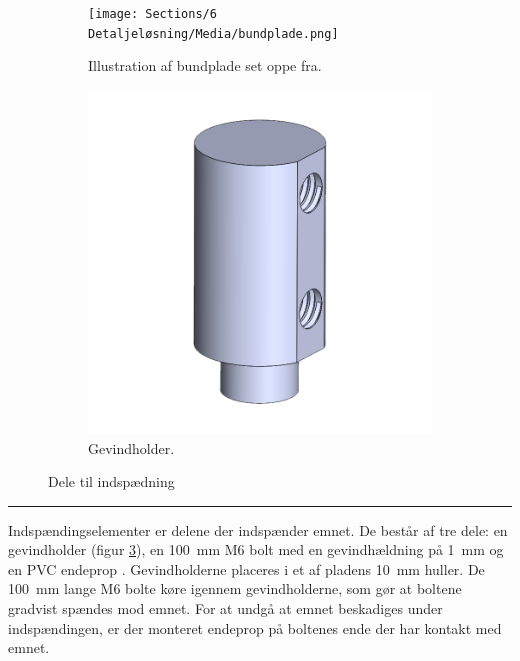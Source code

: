 \begin{figure}[H]
    \centering
    \begin{subfigure}[b]{0.49\textwidth}
         \centering
        \texttt{[image: Sections/6 Detaljeløsning/Media/bundplade.png]}
         \caption{Illustration af bundplade set oppe fra.}
       \label{fig: bundplade}
    \end{subfigure}
    \begin{subfigure}[b]{0.49\textwidth}
      \centering
      \includegraphics[width=.7\linewidth]{Sections/6 Detaljeløsning/Media/Billeder til indspænding/Gevindholder.png}
      \caption{Gevindholder.}
      \label{fig: gevindholder}
    \end{subfigure}
    \caption{Dele til indspædning}
\end{figure} \plainbreak{-.5}

Indspændingselementer er delene der indspænder emnet. De består af tre dele: en gevindholder (figur \ref{fig: gevindholder}), en \SI{100}{mm} M6 bolt med en gevindhældning på \SI{1}{mm} \parencite{RSComponents2025M6RS} og en PVC endeprop \parencite{Profillageret2025RundProfillageret.dk}. Gevindholderne placeres i et af pladens \SI{10}{mm} huller. De \SI{100}{mm} lange M6 bolte køre igennem gevindholderne, som gør at boltene gradvist spændes mod emnet. For at undgå at emnet beskadiges under indspændingen, er der monteret endeprop på boltenes ende der har kontakt med emnet.



